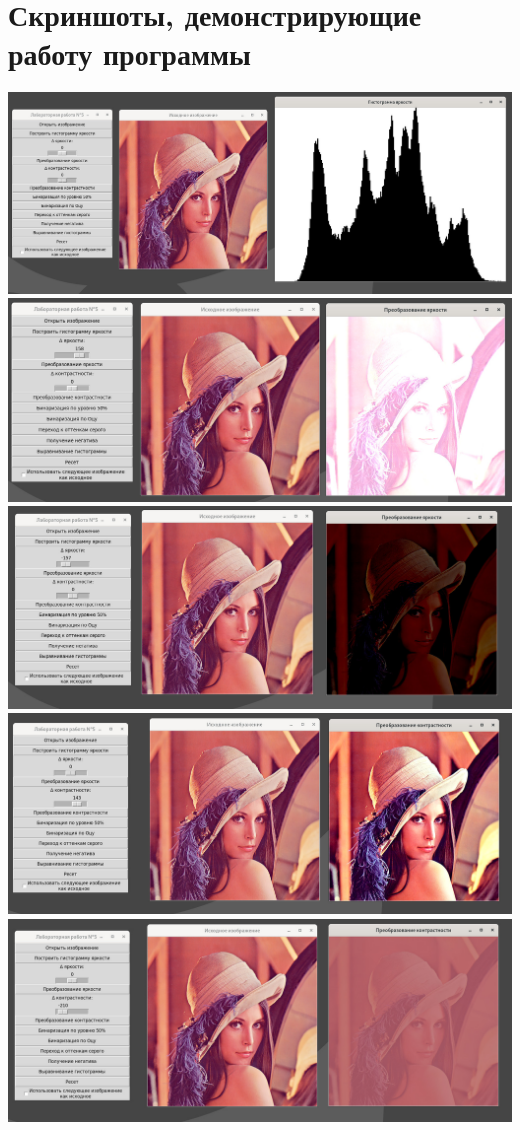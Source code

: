 \documentclass[a4paper,12pt]{article}
\begin{document}
\section{\normalsize{Скриншоты, демонстрирующие работу программы}}
\begin{flushleft}
  \includegraphics[scale=0.9]{hist.jpg}
  \includegraphics[scale=1]{lum_1.jpg}
  \includegraphics[scale=1]{lum_2.jpg}
  \includegraphics[scale=1]{contr_1.jpg}
  \includegraphics[scale=1]{contr_2.jpg}

\end{flushleft}
\end{document}
